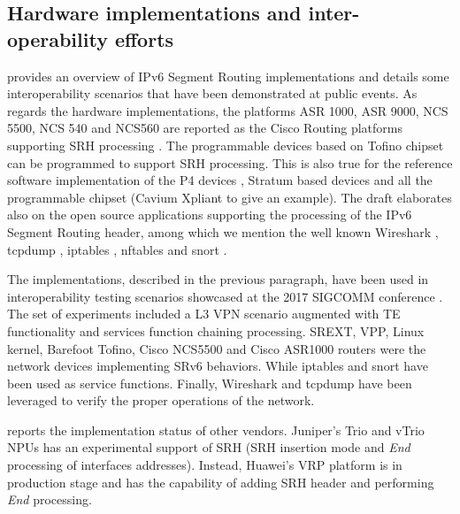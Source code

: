 \subsection{Hardware implementations and inter-operability efforts}
\label{sec:hw_interop}

\cite{srv6-inter-op} provides an overview of IPv6 Segment Routing implementations and details some interoperability scenarios that have been demonstrated at public events. As regards the hardware implementations, the platforms ASR 1000, ASR 9000, NCS 5500, NCS 540 and NCS560 are reported as the Cisco Routing platforms supporting SRH processing \cite{cisco}. The programmable devices based on Tofino chipset \cite{barefoot} can be programmed to support SRH processing. This is also true for the reference software implementation of the P4 devices \cite{bmv2}, Stratum based devices \cite{stratum} and all the programmable chipset (Cavium Xpliant \cite{cavium} to give an example). The draft elaborates also on the open source applications supporting the processing of the IPv6 Segment Routing header, among which we mention the well known Wireshark \cite{wireshark}, tcpdump \cite{tcpdump}, iptables \cite{iptables}, nftables \cite{nftables} and snort \cite{snort}.

The implementations, described in the previous paragraph, have been used in interoperability testing scenarios showcased at the 2017 SIGCOMM conference \cite{interop-demo}. The set of experiments included a L3 VPN scenario augmented with TE functionality and services function chaining processing. SREXT, VPP, Linux kernel, Barefoot Tofino, Cisco NCS5500 and Cisco ASR1000 routers were the network devices implementing SRv6 behaviors. While iptables and snort have been used as service functions. Finally, Wireshark and tcpdump have been leveraged to verify the proper operations of the network. 

\cite{draft-srh} reports the implementation status of other vendors. Juniper's Trio and vTrio NPUs has an experimental support of SRH (SRH insertion mode and \textit{End} processing of interfaces addresses). Instead, Huawei's VRP platform is in production stage and has the capability of adding SRH header and performing \textit{End} processing.